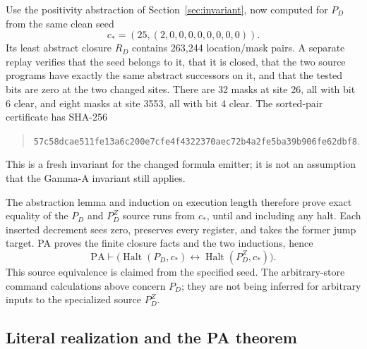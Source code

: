 Use the positivity abstraction of Section~\ref{sec:invariant}, now
computed for \(P_D\) from the same clean seed
\[
 c_*=(25,(2,0,0,0,0,0,0,0,0)).
\]
Its least abstract closure \(R_D\) contains 263,244 location/mask
pairs.  A separate replay verifies that the seed belongs to it,
that it is closed, that the two source programs have exactly the same
abstract successors on it, and that the tested bits are zero at the
two changed sites.  There are 32 masks at site 26, all with bit 6
clear, and eight masks at site 3553, all with bit 4 clear.
The sorted-pair certificate has SHA-256
\begin{quote}\small
\nolinkurl{57c58dcae511fe13a6c200e7cfe4f4322370aec72b4a2fe5ba39b906fe62dbf8}.
\end{quote}
This is a fresh invariant for the changed formula emitter; it is not
an assumption that the Gamma-A invariant still applies.

The abstraction lemma and induction on execution length therefore
prove exact equality of the \(P_D\) and \(P_D^Z\) source runs
from \(c_*\), until and including any halt.  Each inserted decrement
sees zero, preserves every register, and takes the former jump target.
PA proves the finite closure facts and the two inductions, hence
\[
 \mathrm{PA}\vdash
 \bigl(\operatorname{Halt}(P_D,c_*)
          \leftrightarrow\operatorname{Halt}(P_D^Z,c_*)\bigr).
\]
This source equivalence is claimed from the specified seed.  The
arbitrary-store command calculations above concern \(P_D\);
they are not being inferred for arbitrary inputs to the specialized
source \(P_D^Z\).

\subsection{Literal realization and the PA theorem}

